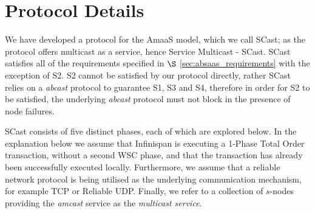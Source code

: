 \section{Protocol Details}\label{sec:decoupled_protocol}
We have developed a protocol for the \textsf{AmaaS} model, which we call \textsf{SCast}; as the protocol offers multicast as a service, hence Service Multicast - \textsf{SCast}.  \textsf{SCast} satisfies all of the requirements specified in $\S$ \ref{sec:absaas_requirements} with the exception of S2.  S2 cannot be satisfied by our protocol directly, rather \textsf{SCast} relies on a \emph{abcast} protocol to guarantee S1, S3 and S4, therefore in order for S2 to be satisfied, the underlying \emph{abcast} protocol must not block in the presence of node failures.  

\textsf{SCast} consists of five distinct phases, each of which are explored below.  In the explanation below we assume that Infinispan is executing a 1-Phase Total Order transaction, without a second WSC phase, and that the transaction has already been successfully executed locally.  Furthermore, we assume that a reliable network protocol is being utilised as the underlying communication mechanism, for example TCP\citep{Cerf:2005:PPN:1064413.1064423} or Reliable UDP\citep{ReliableUDP}.  Finally, we refer to a collection of $s$-nodes providing the \emph{amcast} service as the \emph{multicast service}.  

